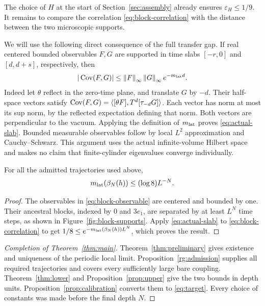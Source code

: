 The choice of $H$ at the start of Section~\ref{sec:assembly} already
ensures $\varepsilon_H\le1/9$. It remains to compare the correlation
\eqref{eq:block-correlation} with the distance between the two
microscopic supports.

We will use the following direct consequence of the full transfer gap.
If real centered bounded observables $F,G$ are supported in time slabs
$[-r,0]$ and $[d,d+s]$, respectively, then
\begin{equation}
\label{eq:actual-slab}
 |\operatorname{Cov}(F,G)|\le\left\lVert F\right\rVert_\infty\left\lVert G\right\rVert_\infty e^{-m_{\mathrm{lat}} d}.
\end{equation}
Indeed let $\theta$ reflect in the zero-time plane, and translate $G$
by $-d$. Their half-space vectors satisfy
$\operatorname{Cov}(F,G)=\langle[\theta F],T^d[\tau_{-d}G]\rangle$.
Each vector has norm at most its sup norm, by the reflected
expectation defining that norm. Both vectors are perpendicular to the
vacuum. Applying the definition of $m_{\mathrm{lat}}$ proves
\eqref{eq:actual-slab}. Bounded measurable observables follow by local
$L^2$ approximation and Cauchy--Schwarz. This argument uses the actual
infinite-volume Hilbert space and makes no claim that finite-cylinder
eigenvalues converge individually.

\begin{proposition}
\label{prop:upper}
For all the admitted trajectories used above,
\begin{equation}
\label{eq:upper-depth}
 m_{\mathrm{lat}}(\beta_N(h))\le(\log8)L^{-N}.
\end{equation}
\end{proposition}

\begin{proof}
The observables in \eqref{eq:block-observable} are centered and bounded
by one. Their ancestral blocks, indexed by $0$ and $3e_1$, are
separated by at least $L^N$ time steps, as shown in
Figure~\ref{fig:block-supports}. Apply \eqref{eq:actual-slab} to
\eqref{eq:block-correlation} to get
$1/8\le e^{-m_{\mathrm{lat}}(\beta_N(h))L^N}$, which proves the result.
\end{proof}



\begin{proof}[Completion of Theorem~\ref{thm:main}]
Theorem~\ref{thm:preliminary} gives existence and uniqueness of the
periodic local limit. Proposition~\ref{rg:admission} supplies all
required trajectories and covers every sufficiently large bare
coupling. Theorem~\ref{thm:lower} and Proposition~\ref{prop:upper}
give the two bounds in depth units. Proposition~\ref{prop:calibration}
converts them to \eqref{eq:target}. Every choice of constants was made
before the final depth $N$.
\end{proof}
